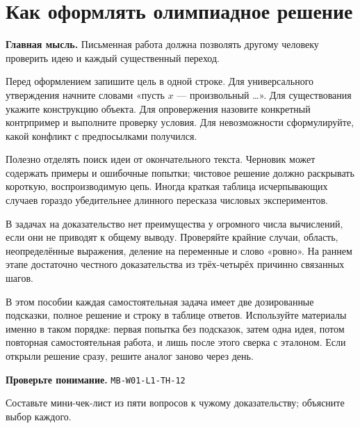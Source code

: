 \documentclass[11pt,a4paper,openany]{book}
\newcommand{\muid}[1]{\texttt{\footnotesize #1}}
\begin{document}
\medskip

\section{Как оформлять олимпиадное решение}\label{theory:12}

\begin{keybox}\textbf{Главная мысль.} Письменная работа должна позволять другому человеку проверить идею и каждый существенный переход.\end{keybox}

Перед оформлением запишите цель в одной строке. Для универсального утверждения начните словами «пусть $x$ — произвольный …». Для существования укажите конструкцию объекта. Для опровержения назовите конкретный контрпример и выполните проверку условия. Для невозможности сформулируйте, какой конфликт с предпосылками получился.


Полезно отделять поиск идеи от окончательного текста. Черновик может содержать примеры и ошибочные попытки; чистовое решение должно раскрывать короткую, воспроизводимую цепь. Иногда краткая таблица исчерпывающих случаев гораздо убедительнее длинного пересказа числовых экспериментов.


В задачах на доказательство нет преимущества у огромного числа вычислений, если они не приводят к общему выводу. Проверяйте крайние случаи, область, неопределённые выражения, деление на переменные и слово «ровно». На раннем этапе достаточно честного доказательства из трёх-четырёх причинно связанных шагов.


В этом пособии каждая самостоятельная задача имеет две дозированные подсказки, полное решение и строку в таблице ответов. Используйте материалы именно в таком порядке: первая попытка без подсказок, затем одна идея, потом повторная самостоятельная работа, и лишь после этого сверка с эталоном. Если открыли решение сразу, решите аналог заново через день.


\begin{center}
\end{center}

\begin{learnbox}\textbf{Проверьте понимание.} \muid{MB-W01-L1-TH-12}\par Составьте мини-чек-лист из пяти вопросов к чужому доказательству; объясните выбор каждого.\end{learnbox}
\end{document}
